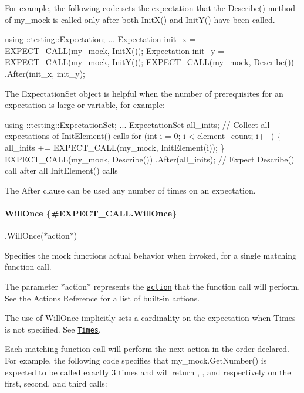 For example, the following code sets the expectation that the {\ttfamily Describe()} method of {\ttfamily my\+\_\+mock} is called only after both {\ttfamily Init\+X()} and {\ttfamily Init\+Y()} have been called.


\begin{DoxyCode}
using ::testing::Expectation;
...
Expectation init\_x = EXPECT\_CALL(my\_mock, InitX());
Expectation init\_y = EXPECT\_CALL(my\_mock, InitY());
EXPECT\_CALL(my\_mock, Describe())
    .After(init\_x, init\_y);
\end{DoxyCode}


The {\ttfamily Expectation\+Set} object is helpful when the number of prerequisites for an expectation is large or variable, for example\+:


\begin{DoxyCode}
using ::testing::ExpectationSet;
...
ExpectationSet all\_inits;
\textcolor{comment}{// Collect all expectations of InitElement() calls}
\textcolor{keywordflow}{for} (\textcolor{keywordtype}{int} i = 0; i < element\_count; i++) \{
  all\_inits += EXPECT\_CALL(my\_mock, InitElement(i));
\}
EXPECT\_CALL(my\_mock, Describe())
    .After(all\_inits);  \textcolor{comment}{// Expect Describe() call after all InitElement() calls}
\end{DoxyCode}


The {\ttfamily After} clause can be used any number of times on an expectation.

\paragraph*{Will\+Once \{\#\+E\+X\+P\+E\+C\+T\+\_\+\+C\+A\+L\+L.\+Will\+Once\}}

{\ttfamily .Will\+Once(}$\ast${\ttfamily action}$\ast${\ttfamily )}

Specifies the mock function\textquotesingle{}s actual behavior when invoked, for a single matching function call.

The parameter $\ast${\ttfamily action}$\ast$ represents the \href{../gmock_for_dummies.md#actions-what-should-it-do}{\tt action} that the function call will perform. See the Actions Reference for a list of built-\/in actions.

The use of {\ttfamily Will\+Once} implicitly sets a cardinality on the expectation when {\ttfamily Times} is not specified. See \href{#EXPECT_CALL.Times}{\tt {\ttfamily Times}}.

Each matching function call will perform the next action in the order declared. For example, the following code specifies that {\ttfamily my\+\_\+mock.\+Get\+Number()} is expected to be called exactly 3 times and will return {}, {}, and {} respectively on the first, second, and third calls\+:


